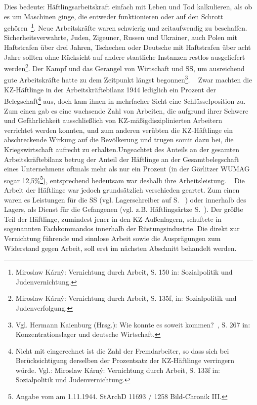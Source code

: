 Dies bedeute: \glqq Häftlingsarbeitskraft einfach mit Leben und Tod kalkulieren, als ob es um Maschinen ginge, die entweder funktionieren oder auf den Schrott gehören\grqq~\footnote{Miroslaw K\'arn\'y: \glqq Vernichtung durch Arbeit\grqq, S. 150 in: Sozialpolitik und Judenvernichtung.}. Neue Arbeitskräfte waren schwierig und zeitaufwendig zu beschaffen. Sicherheitsverwahrte, Juden, Zigeuner, Russen und Ukrainer, auch Polen mit Haftstrafen über drei Jahren, Tschechen oder Deutsche mit Haftstrafen über acht Jahre sollten ohne Rücksicht auf andere staatliche Instanzen restlos ausgeliefert werden\footnote{Miroslaw K\'arn\'y: \glqq Vernichtung durch Arbeit\grqq, S. 135f, in: Sozialpolitik und Judenverfolgung.}. Der Kampf und das Gerangel von Wirtschaft und SS, um ausreichend gute Arbeitskräfte hatte zu dem Zeitpunkt längst begonnen\footnote{Vgl. Hermann Kaienburg (Hrsg.): \glqq Wie konnte es soweit kommen?\grqq~, S. 267 in: Konzentrationslager und deutsche Wirtschaft.}.
~\newline
Zwar machten die KZ-Häftlinge in der Arbeitskräftebilanz 1944 lediglich ein Prozent der Belegschaft\footnote{Nicht mit eingerechnet ist die Zahl der Fremdarbeiter, so dass sich bei Berücksichtigung derselben der Prozentsatz der KZ-Häftlinge verringern würde. Vgl.: Miroslaw K\'arn\'y: \glqq Vernichtung durch Arbeit\grqq, S. 133f in: Sozialpolitik und Judenvernichtung.} aus, doch kam ihnen in mehrfacher Sicht eine Schlüsselposition zu. Zum einen gab es eine wachsende Zahl von Arbeiten, die aufgrund ihrer Schwere und Gefährlichkeit ausschließlich von \glqq KZ-mäßig\grqq disziplinierten Arbeitern verrichtet werden konnten, und zum anderen verübten die KZ-Häftlinge ein abschreckende Wirkung auf die Bevölkerung und trugen somit dazu bei, die Kriegswirtschaft aufrecht zu erhalten.\newline Ungeachtet des Anteils an der gesamten Arbeitskräftebilanz betrug der Anteil der Häftlinge an der Gesamtbelegschaft eines Unternehmens oftmals mehr als nur ein Prozent (in der Görlitzer WUMAG sogar 12,5\%\footnote{Angabe vom am 1.11.1944. StArchD 11693 / 1258 Bild-Chronik III.}), entsprechend bedeutsam war deshalb ihre Arbeitsleistung.
~\newline
Die Arbeit der Häftlinge war jedoch grundsätzlich verschieden geartet. Zum einen waren es Leistungen für die SS (vgl. Lagerschreiber auf S. ~\pageref{schreiber}) oder innerhalb des Lagers, als Dienst für die Gefangenen (vgl. z.B. Häftlingsärtze S.~\pageref{arzt}). Der größte Teil der Häftlinge, zumindest jener in den KZ-Außenlagern, schuftete in sogenannten Fachkommandos innerhalb der Rüstungsindustrie. Die direkt zur Vernichtung führende und sinnlose Arbeit sowie die Ausprägungen zum Widerstand gegen Arbeit, soll erst im nächsten Abschnitt behandelt werden.


